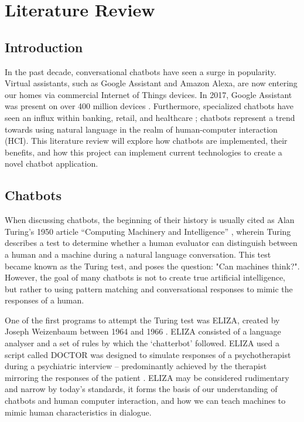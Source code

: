 \chapter{Literature Review}
\label{ch:lit}
\section{Introduction}
In the past decade, conversational chatbots have seen a surge in popularity. Virtual assistants, such as Google Assistant and Amazon Alexa, are now entering our homes via commercial Internet of Things devices. In 2017, Google Assistant was present on over 400 million devices \cite{chandra2018}. Furthermore, specialized chatbots have seen an influx within banking, retail, and healthcare \cite{gvr2017}; chatbots represent a trend towards using natural language in the realm of human-computer interaction (HCI).  This literature review will explore how chatbots are implemented, their benefits, and how this project can implement current technologies to create a novel chatbot application.

\section{Chatbots}
When discussing chatbots, the beginning of their history is usually cited as Alan Turing’s 1950 article “Computing Machinery and Intelligence” \cite{turing1950computing}, wherein Turing describes a test to determine whether a human evaluator can distinguish between a human and a machine during a natural language conversation. This test became known as the Turing test, and poses the question: "Can machines think?". However, the goal of many chatbots is not to create true artificial intelligence, but rather to using pattern matching and conversational responses to mimic the responses of a human.

One of the first programs to attempt the Turing test was ELIZA, created by Joseph Weizenbaum between 1964 and 1966 \cite{weizenbaum1976computer}. ELIZA consisted of a language analyser and a set of rules by which the ‘chatterbot’ followed. ELIZA used a script called DOCTOR was designed to simulate responses of a psychotherapist during a psychiatric interview – predominantly achieved by the therapist mirroring the responses of the patient  \cite{weizenbaum1976computer}. ELIZA may be considered rudimentary and narrow by today’s standards, it forms the basis of our understanding of chatbots and human computer interaction, and how we can teach machines to mimic human characteristics in dialogue.


